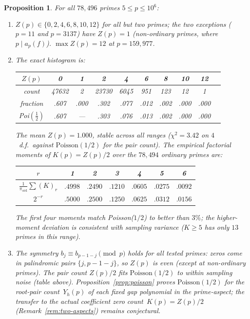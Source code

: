\documentclass[11pt]{article}
\newtheorem{proposition}[theorem]{Proposition}
\theoremstyle{definition}
\theoremstyle{remark}
\begin{document}
\begin{proposition}\label{prop:Zp-data}
For all $78{,}496$ primes $5 \le p \le 10^6$:
\begin{enumerate}
\item $Z(p) \in \{0, 2, 4, 6, 8, 10, 12\}$ for all but two primes;
      the two exceptions ($p = 11$ and $p = 3137$) have $Z(p) = 1$
      (non-ordinary primes, where $p \mid a_p(f)$).
      $\max Z(p) = 12$ at $p = 159{,}977$.
\item The exact histogram is:
\begin{center}
\begin{tabular}{c|ccccccccc}
$Z(p)$ & 0 & 1 & 2 & 4 & 6 & 8 & 10 & 12 \\
\hline
count & 47632 & 2 & 23730 & 6045 & 951 & 123 & 12 & 1 \\
fraction & .607 & .000 & .302 & .077 & .012 & .002 & .000 & .000 \\
Poi$(\tfrac{1}{2})$ & .607 & --- & .303 & .076 & .013 & .002 & .000 & .000
\end{tabular}
\end{center}
The mean $Z(p) = 1.000$, stable across all ranges
($\chi^2 = 3.42$ on $4$~d.f.\ against
$\mathrm{Poisson}(1/2)$ for the pair count).
The empirical factorial moments of $K(p) = Z(p)/2$
over the $78{,}494$ ordinary primes are:
\begin{center}
\begin{tabular}{c|cccccc}
$r$ & 1 & 2 & 3 & 4 & 5 & 6 \\
\hline
$\frac{1}{\pi_{\mathrm{ord}}}\sum (K)_r$
& $.4998$ & $.2490$ & $.1210$ & $.0605$ & $.0275$ & $.0092$ \\
$2^{-r}$ & $.5000$ & $.2500$ & $.1250$ & $.0625$ & $.0312$ & $.0156$
\end{tabular}
\end{center}
The first four moments match Poisson($1/2$)
to better than $3\%$; the higher-moment deviation
is consistent with sampling variance
($K \ge 5$ has only $13$ primes in this range).
\item The symmetry $b_j \equiv b_{p-1-j} \pmod{p}$ holds for
      all tested primes: zeros come in palindromic pairs
      $\{j, p{-}1{-}j\}$, so $Z(p)$ is even (except at non-ordinary primes).
      The pair count $Z(p)/2$ fits $\mathrm{Poisson}(1/2)$ to within
      sampling noise (table above).
      Proposition~\ref{prop:poisson} proves
      $\mathrm{Poisson}(1/2)$ for the
      root-pair count~$Y_h(p)$ of each fixed
      gap polynomial in the prime-aspect;
      the transfer to the actual coefficient
      zero count~$K(p) = Z(p)/2$
      (Remark~\ref{rem:two-aspects}) remains
      conjectural.
\end{enumerate}
\end{proposition}
\end{document}
